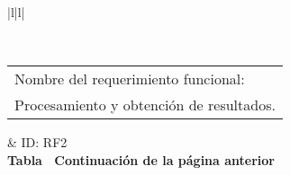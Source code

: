 \begin{longtable}{|l|l|}
\caption{Requerimiento funcional 2}
\label{RF2}\\
\hline
\begin{tabular}[c]{@{}l@{}}Nombre del requerimiento funcional:\\ Procesamiento y obtención de resultados.\end{tabular}                                                                 & ID: RF2                                                                                                                                                                                                                                                                                                                                                                                                              \\ \hline
\endfirsthead
%
%
{{\bfseries Tabla \thetable\ Continuación de la página anterior}} \\
\endhead
%
                                                                                                                                                                                                                                                                                                                                                                                                                                                                                                                                \\ \hline
{}                                                                                                                                                                                                                                                                                                                                                                                                                                                                                                                                               \\ \hline
{}                                                                                                                                                                                                                                                                                                                                                                                                                                                                                                                                                                   \\ \hline

\end{longtable}
